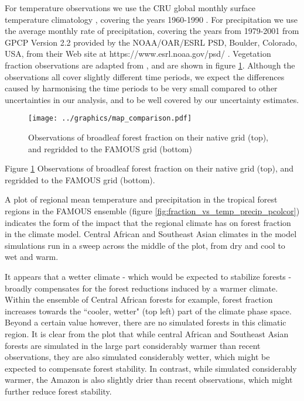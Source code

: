 \documentclass[gmd, manuscript]{copernicus}
\begin{document}
For temperature observations we use the CRU global monthly surface temperature climatology \cite{jones1999face}, covering the years 1960-1990 . For precipitation we use the average monthly rate of precipitation, covering the years from 1979-2001 from GPCP Version 2.2 provided by the NOAA/OAR/ESRL PSD, Boulder, Colorado, USA, from their Web site at https://www.esrl.noaa.gov/psd/ \cite{Adler2003}. Vegetation fraction observations are adapted from \cite{loveland2000landcover}, and are shown in figure \ref{fig:map_comparison}. Although the observations all cover slightly different time periods, we expect the differences caused by harmonising the time periods to be very small compared to other uncertainties in our analysis, and to be well covered by our uncertainty estimates.


\begin{figure}[t]
\texttt{[image: ../graphics/map\_comparison.pdf]}
\caption{Observations of broadleaf forest fraction on their native grid (top), and regridded to the FAMOUS grid (bottom)}
\label{fig:map_comparison}
\end{figure}

Figure \ref{fig:map_comparison} Observations of broadleaf forest fraction on their native grid (top), and regridded to the FAMOUS grid (bottom).

A plot of regional mean temperature and precipitation in the tropical forest regions in the FAMOUS ensemble (figure \ref{fig:fraction_vs_temp_precip_pcolcor}) indicates the form of the impact that the regional climate has on forest fraction in the climate model. Central African and Southeast Asian climates in the model simulations run in a sweep across the middle of the plot, from dry and cool to wet and warm. 

It appears that a wetter climate - which would be expected to stabilize forests - broadly compensates for the forest reductions induced by a warmer climate. Within the ensemble of Central African forests for example, forest fraction increases towards the ``cooler, wetter" (top left) part of the climate phase space. Beyond a certain value however, there are no simulated forests in this climatic region. It is clear from the plot that while central African and Southeast Asian forests are simulated in the large part considerably warmer than recent observations, they are also simulated considerably wetter, which might be expected to compensate forest stability. In contrast, while simulated considerably warmer, the Amazon is also slightly drier than recent observations, which might further reduce forest stability.
\end{document}

